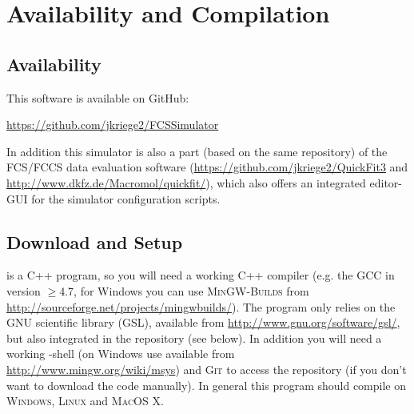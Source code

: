 
\chapter{Availability and Compilation}
\label{sec:availability_compilation}
\section{Availability}
\label{sec:Availability}
This software is available on GitHub:
\begin{center}
	\url{https://github.com/jkriege2/FCSSimulator}
\end{center}
In addition this simulator is also a part (based on the same repository) of the FCS/FCCS data evaluation software \qf (\url{https://github.com/jkriege2/QuickFit3} and \url{http://www.dkfz.de/Macromol/quickfit/}), which also offers an integrated editor-GUI for the simulator configuration scripts.

\section{Download and Setup}
\label{sec:DownloadAndSetup}
\df is a C++ program, so you will need a working C++ compiler (e.g. the \textsc{GCC} in version $\geq$4.7, for Windows you can use \textsc{MinGW-Builds} from \url{http://sourceforge.net/projects/mingwbuilds/}). The program only relies on the GNU scientific library (GSL), available from \url{http://www.gnu.org/software/gsl/}, but also integrated in the repository (see below). In addition you will need a working \bash-shell (on Windows use \msys available from \url{http://www.mingw.org/wiki/msys}) and \textsc{Git} to access the repository (if you don't want to download the code manually). In general this program should compile on \textsc{Windows}, \textsc{Linux} and \textsc{MacOS X}.\\[10mm]

